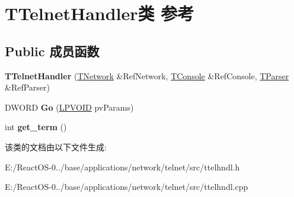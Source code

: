\hypertarget{class_t_telnet_handler}{}\section{T\+Telnet\+Handler类 参考}
\label{class_t_telnet_handler}
\subsection*{Public 成员函数}
\begin{DoxyCompactItemize}
\item 
\mbox{\label{class_t_telnet_handler_a7fb13f559a8704ec1a8d6b2001281a3f}} 
{\bfseries T\+Telnet\+Handler} (\hyperlink{class_t_network}{T\+Network} \&Ref\+Network, \hyperlink{class_t_console}{T\+Console} \&Ref\+Console, \hyperlink{class_t_parser}{T\+Parser} \&Ref\+Parser)
\item 
\mbox{\label{class_t_telnet_handler_a6711422f29eae8f6a4ac1195d76c470c}} 
D\+W\+O\+RD {\bfseries Go} (\hyperlink{interfacevoid}{L\+P\+V\+O\+ID} pv\+Params)
\item 
\mbox{\label{class_t_telnet_handler_a65c83349caab46d9e979daf18c9b1b5d}} 
int {\bfseries get\+\_\+term} ()
\end{DoxyCompactItemize}


该类的文档由以下文件生成\+:\begin{DoxyCompactItemize}
\item 
E\+:/\+React\+O\+S-\/0../base/applications/network/telnet/src/ttelhndl.\+h\item 
E\+:/\+React\+O\+S-\/0../base/applications/network/telnet/src/ttelhndl.\+cpp\end{DoxyCompactItemize}
